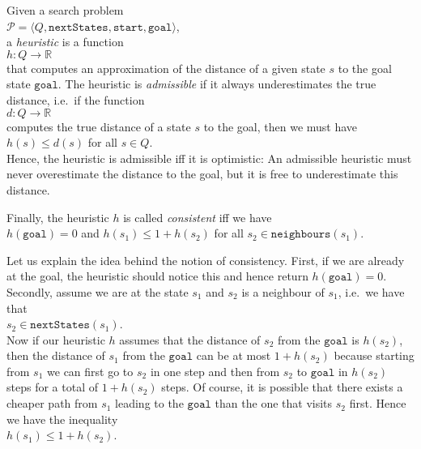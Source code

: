\begin{Definition}[Heuristic]
Given a search problem
\\[0.2cm]
\hspace*{1.3cm}
$\mathcal{P} = \langle Q, \mathtt{nextStates}, \mathtt{start}, \mathtt{goal} \rangle$,
\\[0.2cm]
a \emph{\color{blue}heuristic} is a function
\\[0.2cm]
\hspace*{1.3cm}
$h: Q \rightarrow \mathbb{R}$
\\[0.2cm]
that computes an approximation of the distance of a given state $s$ to the goal state $\mathtt{goal}$.
The heuristic is \emph{\color{blue}admissible} if it always underestimates the true distance, i.e.~if the function
\\[0.2cm]
\hspace*{1.3cm}
$d:Q \rightarrow \mathbb{R}$
\\[0.2cm]
computes the true distance of a state $s$ to the goal, then we must have
\\[0.2cm]
\hspace*{1.3cm}
$h(s) \leq d(s)$ \quad for all $s \in Q$.
\\[0.2cm]
Hence, the heuristic is admissible iff it is optimistic:  An admissible heuristic must never overestimate the
distance to the goal, but it is free to underestimate this distance.

Finally, the  heuristic $h$ is called \emph{\color{blue}consistent} iff we have
\\[0.2cm]
\hspace*{1.3cm}
$h(\mathtt{goal}) = 0$ \quad and \quad $h(s_1) \leq 1 + h(s_2)$ \quad for all $s_2 \in \mathtt{neighbours}(s_1)$.  \eod
\end{Definition}

Let us explain the idea behind the notion of consistency.  First, if we are already at the goal, the heuristic
should notice this and hence return $h(\mathtt{goal}) = 0$.  Secondly, assume we are at the state $s_1$ and $s_2$ is a
neighbour of $s_1$, i.e.~we have that 
\\[0.2cm]
\hspace*{1.3cm}
$s_2 \in \mathtt{nextStates}(s_1)$.
\\[0.2cm]
Now if our heuristic $h$ assumes that the distance of $s_2$ from the $\mathtt{goal}$ is $h(s_2)$, then the distance of
$s_1$ from the $\mathtt{goal}$ can be at most $1 + h(s_2)$ because starting from $s_1$ we can first go to $s_2$
in one step and then from $s_2$ to $\mathtt{goal}$ in $h(s_2)$ steps for a total of $1 + h(s_2)$ steps.  Of
course, it is possible that there exists a cheaper path from $s_1$ leading to the $\mathtt{goal}$ than the one
that visits $s_2$ first.  Hence we have the inequality 
\\[0.2cm]
\hspace*{1.3cm}
$h(s_1) \leq 1 + h(s_2)$.

